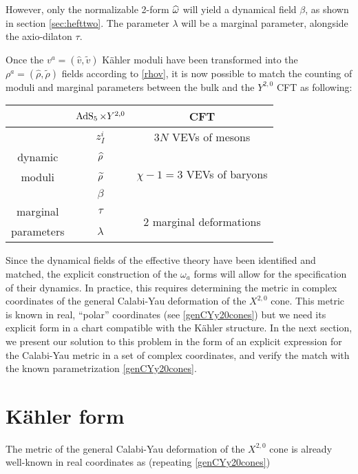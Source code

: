 However, only the normalizable 2-form $\widehat{\omega}$ will yield a dynamical field $\beta$, as shown in section \ref{sec:hefttwo}. The parameter $\lambda$ will be a marginal parameter, alongside the axio-dilaton $\tau$.

Once the $v^a = (\hat v, \tilde v)$ K\"ahler moduli have been transformed into the $\rho^a = (\hat \rho, \tilde \rho)$ fields according to \eqref{rhov}, it is now possible to match the counting of moduli and marginal parameters between the bulk and the $Y^{2,0}$ CFT as following:

\begin{center}
\begin{tabular}{ccc}
	& $\operatorname{AdS}_{5} \times Y^{2,0}$ & CFT \\ \midrule \midrule
			& $ z_I^i$ & $3N$ VEVs of mesons\\ \cmidrule{2-3} 
dynamic 		& $\widehat{\rho}$ & \multirow{3}{*}{$\chi-1 = 3$ VEVs of baryons} \\
moduli			& $\widetilde{\rho}$ & \\
			& $ \beta$ & \\ \midrule
marginal	& $\tau$ 	&  \multirow{2}{*}{$2$ marginal deformations}	\\
parameters			& $\lambda$ &	
\end{tabular}
\end{center}

Since the dynamical fields of the effective theory have been identified and matched, the explicit construction of the $\omega_a$ forms will allow for the specification of their dynamics. In practice, this requires determining the metric in complex coordinates of the general Calabi-Yau deformation of the $X^{2,0}$ cone. This metric is known \cite{PandoZayasy20} in real, ``polar'' coordinates (see \eqref{genCYy20cones}) but we need its explicit form in a chart compatible with the K\"ahler structure. In the next section, we present our solution to this problem in the form of an explicit expression for the Calabi-Yau metric in a set of complex coordinates, and verify the match with the known parametrization \eqref{genCYy20cones}.


\section{K\"ahler form}

The metric of the general Calabi-Yau deformation of the $X^{2,0}$ cone is already well-known in real coordinates as (repeating \eqref{genCYy20cones})

